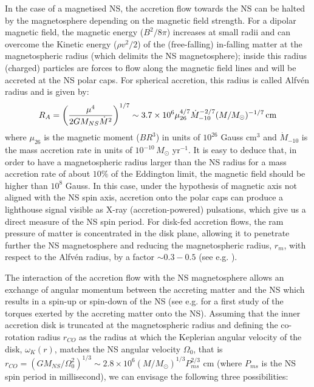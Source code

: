 \documentclass[graybox]{svmult}
\begin{document}
In the case of a magnetised NS, the accretion flow towards the NS can be halted by the magnetosphere depending on the magnetic field strength. For a dipolar magnetic field, the magnetic energy ($B^2/8\pi$) increases at small radii and can overcome the Kinetic energy ($\rho v^2/2$) of the (free-falling) in-falling matter at the magnetospheric radius (which delimits the NS magnetosphere); inside this radius (charged) particles are forces to flow along the magnetic field lines and will be accreted at the NS polar caps. For spherical accretion, this radius is called Alfv\'en radius and is given by:
\begin{equation}
\label{Alfven}
R_A = \left(\frac{\mu^4}{2 G M_{NS} \dot M^2}\right)^{1/7} \sim 3.7 \times 10^6 \mu_{26}^{4/7} \dot M_{-10}^{-2/7} (M/M_\odot)^{-1/7}\, \rm cm
\end{equation}
where $\mu_{26}$ is the magnetic moment ($B R^3$) in units of $10^{26}$ Gauss cm$^3$ and $\dot M_{-10}$ is the mass accretion rate in units of $10^{-10}\, M_\odot$ yr$^{-1}$. It is easy to deduce that, in order to have a magnetospheric radius larger than the NS radius for a mass accretion rate of about $10\%$ of the Eddington limit, the magnetic field should be higher than $10^8$ Gauss. In this case, under the hypothesis of magnetic axis not aligned with the NS spin axis, accretion onto the polar caps can produce a lighthouse signal visible as X-ray (accretion-powered) pulsations, which give us a direct measure of the NS spin period.
For disk-fed accretion flows, the ram pressure of matter is concentrated in the disk plane, allowing it to penetrate further the NS magnetosphere and reducing the magnetospheric radius, $r_m$, with respect to the Alfv\'en radius, by a factor $\sim 0.3-0.5$ (see e.g. \cite{Ghosh1991,Burderi1998}).

The interaction of the accretion flow with the NS magnetosphere allows an exchange of angular momentum between the accreting matter and the NS which results in a spin-up or spin-down of the NS (see e.g. \cite{Ghosh1979} for a first study of the torques exerted by the accreting matter onto the NS). Assuming that the inner accretion disk is truncated at the magnetospheric radius and defining the co-rotation radius $r_{CO}$ as the radius at which the Keplerian angular velocity of the disk, $\omega_K(r)$, matches the NS angular velocity $\Omega_0$, that is $r_{CO} = (G M_{NS} / \Omega^2_0)^{1/3} \sim 2.8 \times 10^6 (M / M_\odot)^{1/3} P_{ms}^{2/3}$ cm (where $P_{ms}$ is the NS spin period in millisecond), we can envisage the following three possibilities: 
\end{document}
